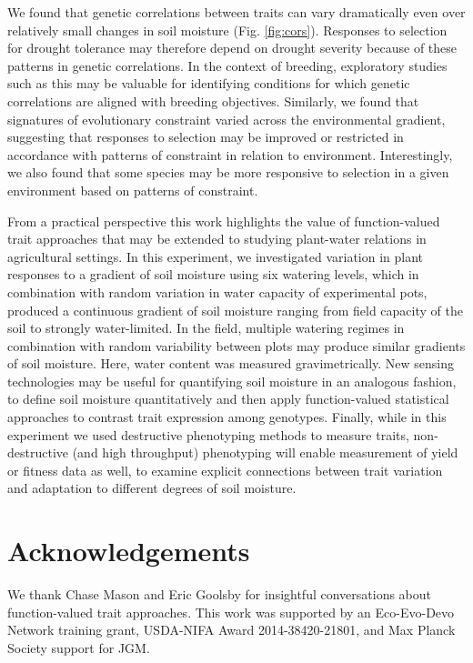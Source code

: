 \documentclass[jou,floatsintext]{apa6}
\begin{document}
We found that genetic correlations between traits can vary dramatically even over relatively small changes in soil moisture (Fig. \ref{fig:cors}). Responses to selection for drought tolerance may therefore depend on drought severity because of these patterns in genetic correlations. In the context of breeding, exploratory studies such as this may be valuable for identifying conditions for which genetic correlations are aligned with breeding objectives. Similarly, we found that signatures of evolutionary constraint varied across the environmental gradient, suggesting that responses to selection may be improved or restricted in accordance with patterns of constraint in relation to environment. Interestingly, we also found that some species may be more responsive to selection in a given environment based on patterns of constraint.

From a practical perspective this work highlights the value of function-valued trait approaches that may be extended to studying plant-water relations in agricultural settings. In this experiment, we investigated variation in plant responses to a gradient of soil moisture using six watering levels, which in combination with random variation in water capacity of experimental pots, produced a continuous gradient of soil moisture ranging from field capacity of the soil to strongly water-limited. In the field, multiple watering regimes in combination with random variability between plots may produce similar gradients of soil moisture. Here, water content was measured gravimetrically. New sensing technologies may be useful for quantifying soil moisture in an analogous fashion, to define soil moisture quantitatively and then apply function-valued statistical approaches to contrast trait expression among genotypes. Finally, while in this experiment we used destructive phenotyping methods to measure traits, non-destructive (and high throughput) phenotyping will enable measurement of yield or fitness data as well, to examine explicit connections between trait variation and adaptation to different degrees of soil moisture.

\hypertarget{acknowledgements}{%
\section{Acknowledgements}\label{acknowledgements}}

We thank Chase Mason and Eric Goolsby for insightful conversations about function-valued trait approaches. This work was supported by an Eco-Evo-Devo Network training grant, USDA-NIFA Award 2014-38420-21801, and Max Planck Society support for JGM.
\end{document}
